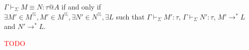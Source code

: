 \documentclass[9pt, a4paper]{extarticle}
\theoremstyle{break}
\newcommand{\rulefbox}[1]{\fbox{\ensuremath{#1}} \hspace{1mm}}
\newcommand{\figheader}[2]{
  \begin{flushleft}
    #2 {\bf \normalsize #1}
\end{flushleft}}
\newcommand{\G}{\Gamma}
\newcommand{\V}{\vdash_\Sigma}
\newcommand{\VT}{\vdash\hspace{-.50em}\raisebox{0.28em}{\tiny{$\TB$}}}
\newcommand{\iskind}{\text{\ kind}}
\newcommand{\TW}{\triangleright}
\newcommand{\TB}{\blacktriangleright}
\newcommand{\E}{\equiv}
\newcommand{\WStar}{\textsc{W-Star}}
\newcommand{\WAbs}{\textsc{W-Abs}}
\newcommand{\WCsp}{\textsc{W-Csp}}
\newcommand{\KVar}{\textsc{K-Var}}
\newcommand{\KAbs}{\textsc{K-Abs}}
\newcommand{\KApp}{\textsc{K-App}}
\newcommand{\KTW}{\textsc{K-$\TW$}}
\newcommand{\KGen}{\textsc{K-Gen}}
\newcommand{\KCsp}{\textsc{K-Csp}}
\newcommand{\TVar}{\textsc{T-Var}}
\newcommand{\red}[1]{\textcolor{red}{ #1 }}
\begin{document}
\begin{thm}
	$\G \V M \E N : \tau @A$ if and only if\\
	$\exists M' \in M^\%, M' \in M^\%, \exists N' \in N^\%, \exists L$
	such that $\G \V M' : \tau$, $\G \V N' : \tau$, $M' \longrightarrow^* L$ and $N' \longrightarrow^* L$.
\end{thm}

\red{TODO}


%
% 
% 
\end{document}

